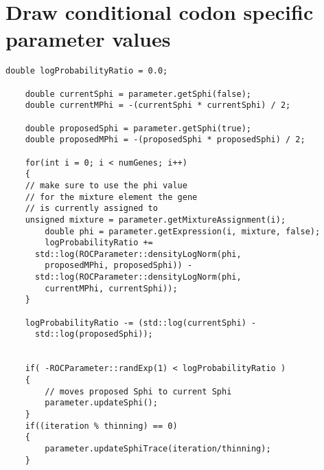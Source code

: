 \documentclass[11pt]{article}
\begin{document}
  \section{Draw conditional codon specific parameter values}
   \begin{lstlisting}[frame=single]
    double logProbabilityRatio = 0.0;

    double currentSphi = parameter.getSphi(false);
    double currentMPhi = -(currentSphi * currentSphi) / 2;

    double proposedSphi = parameter.getSphi(true);
    double proposedMPhi = -(proposedSphi * proposedSphi) / 2;

    for(int i = 0; i < numGenes; i++)
    {
	// make sure to use the phi value 
	// for the mixture element the gene
	// is currently assigned to
	unsigned mixture = parameter.getMixtureAssignment(i);
        double phi = parameter.getExpression(i, mixture, false);
        logProbabilityRatio += 
	  std::log(ROCParameter::densityLogNorm(phi, 
	    proposedMPhi, proposedSphi)) - 
	  std::log(ROCParameter::densityLogNorm(phi, 
	    currentMPhi, currentSphi));
    }

    logProbabilityRatio -= (std::log(currentSphi) - 
      std::log(proposedSphi));


    if( -ROCParameter::randExp(1) < logProbabilityRatio )
    {
        // moves proposed Sphi to current Sphi
        parameter.updateSphi();
    }
    if((iteration % thinning) == 0)
    {
        parameter.updateSphiTrace(iteration/thinning);
    }
   \end{lstlisting}
  
  
  
\end{document}
